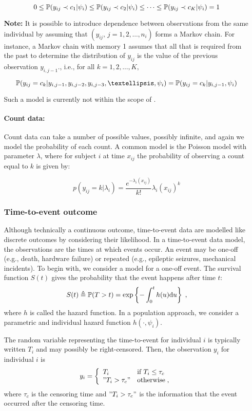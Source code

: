 $$0\leq\mathbb{P}(y_{ij}\prec c_1|\psi_i)\leq\mathbb{P}(y_{ij}\prec c_2|\psi_i)\leq \cdots \leq\mathbb{P}(y_{ij}\prec c_K|\psi_i)=1$$


{\bf Note:} It is possible to introduce dependence between observations from the same individual by assuming that $(y_{ij},\,j=1,2,\ldots,n_i)$ forms a Markov chain. For instance, a Markov chain with memory 1 assumes that all that is required from the past to determine the distribution of $y_{ij}$ is the value of the previous observation $y_{i,j-1}$., i.e., for all $k=1,2,\ldots ,K$,

$$\prob(y_{ij}=c_k|y_{i,j-1},y_{i,j-2},y_{i,j-3},…,\psi_i)=\prob(y_{ij}=c_k|y_{i,j-1},\psi_i)$$

Such a model is currently not within the scope of \monolix.

\paragraph{Count data:} Count data can take a number of possible values, possibly infinite, and again we model the probability of each count. A common model is the Poisson model with parameter $\lambda$, where for subject $i$ at time $x_{ij}$ the probability of observing a count equal to $k$ is given by:

$$p(y_{ij} = k | \lambda_i) = \dfrac{e^{-\lambda_i(x_{ij})}}{k!}\lambda_i(x_{ij})^k $$

\subsubsection{Time-to-event outcome}

Although technically a continuous outcome, time-to-event data are modelled like discrete outcomes by considering their likelihood. In a time-to-event data model, the observations are the times at which events occur. An event may be one-off (e.g., death, hardware failure) or repeated (e.g., epileptic seizures, mechanical incidents).
To begin with, we consider a model for a one-off event. The survival function $S(t)$ gives the probability that the event happens after time $t$:
\begin{equation}\label{survival}
S(t)  \triangleq \mathbb{P}(T >t) = \exp\left\{-\int_{0}^{t}h(u)\textrm{d}u\right\}\;,
\end{equation}
where $h$ is called the hazard function. 
In a population approach, we consider a parametric and individual hazard function $h(\cdot,\psi_i)$.

The random variable representing the time-to-event for individual $i$ is typically written $T_i$ and may possibly be right-censored. Then, the observation $y_i$ for individual $i$ is
\begin{equation}
    y_i = \left\{
    \begin{array}{ll}
        T_i & \mbox{if } T_i \leq \tau_c \\
        "T_i > \tau_c" & \mbox{otherwise}\;,
    \end{array}
\right.
\end{equation}
where $\tau_c$ is the censoring time and $"T_i > \tau_c"$ is the information that the event occurred after the censoring time. 

